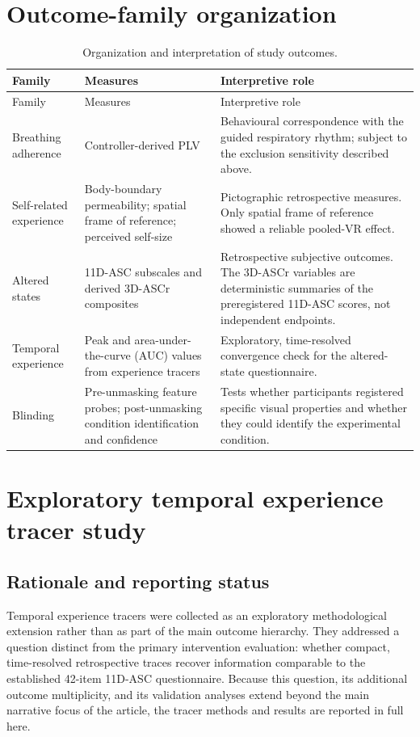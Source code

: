 \documentclass[pdflatex,sn-mathphys-num]{sn-jnl}
\begin{document}
\section{Outcome-family organization}

\begin{longtable}{p{}p{}p{}}
\caption{Organization and interpretation of study outcomes.}\label{tab:s_outcomes}\\
\toprule
Family & Measures & Interpretive role \\
\midrule
\endfirsthead
\toprule
Family & Measures & Interpretive role \\
\midrule
\endhead
Breathing adherence & Controller-derived PLV & Behavioural correspondence with the guided respiratory rhythm; subject to the exclusion sensitivity described above. \\
Self-related experience & Body-boundary permeability; spatial frame of reference; perceived self-size & Pictographic retrospective measures. Only spatial frame of reference showed a reliable pooled-VR effect. \\
Altered states & 11D-ASC subscales and derived 3D-ASCr composites & Retrospective subjective outcomes. The 3D-ASCr variables are deterministic summaries of the preregistered 11D-ASC scores, not independent endpoints. \\
Temporal experience & Peak and area-under-the-curve (AUC) values from experience tracers & Exploratory, time-resolved convergence check for the altered-state questionnaire. \\
Blinding & Pre-unmasking feature probes; post-unmasking condition identification and confidence & Tests whether participants registered specific visual properties and whether they could identify the experimental condition. \\
\bottomrule
\end{longtable}

\section{Exploratory temporal experience tracer study}

\subsection{Rationale and reporting status}

Temporal experience tracers were collected as an exploratory methodological extension rather than as part of the main outcome hierarchy. They addressed a question distinct from the primary intervention evaluation: whether compact, time-resolved retrospective traces recover information comparable to the established 42-item 11D-ASC questionnaire. Because this question, its additional outcome multiplicity, and its validation analyses extend beyond the main narrative focus of the article, the tracer methods and results are reported in full here.
\end{document}
